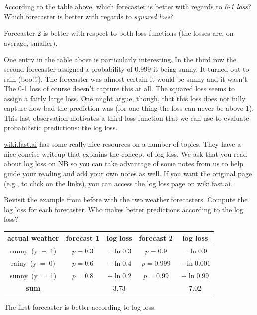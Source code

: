 \documentclass[assignment03_Solutions]{subfiles}
\begin{document}
\normalsize %

\begin{understandingcheck}
According to the table above, which forecaster is better with regards to \emph{0-1 loss}?  Which forecaster is better with regards to \emph{squared loss}?

\begin{boxedsolution}
Forecaster 2 is better with respect to both loss functions (the losses are, on average, smaller).
\end{boxedsolution}
\end{understandingcheck}

One entry in the table above is particularly interesting.  In the third row the second forecaster assigned a probability of $0.999$ it being sunny.  It turned out to rain (boo!!!).  The forecaster was almost certain it would be sunny and it wasn't.  The 0-1 loss of course doesn't capture this at all.  The squared loss seems to assign a fairly large loss.  One might argue, though, that this loss does not fully capture how bad the prediction was (for one thing the loss can never be above 1).  This last observation motivates a third loss function that we can use to evaluate probabilistic predictions: the log loss.

\begin{externalresources}[(30 minutes)]
\url{wiki.fast.ai} has some really nice resources on a number of topics.  They have a nice concise writeup that explains the concept of log loss.  We ask that you read about \href{http://nb.mit.edu/f/55213}{log loss on NB} so you can take advantage of some notes from us to help guide your reading and add your own notes as well.  If you want the original page (e.g., to click on the links), you can access the \href{http://wiki.fast.ai/index.php/Log_Loss}{log loss page on wiki.fast.ai}.
\begin{exercise}
Revisit the example from before with the two weather forecasters.  Compute the log loss for each forecaster.  Who makes better predictions according to the log loss?
\begin{boxedsolution}
\begin{center}
\small
\begin{tabular}{c | c | c | c | c }
\hline
actual weather & forecast 1 & log loss & forecast 2 & log loss \\
\hline
\mbox{sunny (y = 1)} & $p = 0.3$ & $-\ln 0.3$ & $p = 0.9$ &  $-\ln 0.9$\\
\mbox{rainy (y = 0)} & $p = 0.6$  &  $-\ln 0.4$ & $p = 0.999$ &  $-\ln 0.001$\\ 
\mbox{sunny (y = 1)} & $p = 0.8$ & $-\ln 0.2$ & $p = 0.99$ & $-\ln 0.99$\\
\hline
\textbf{sum} & & $3.73$ &  & 7.02
\end{tabular}
\end{center}
The first forecaster is better according to log loss.

\end{boxedsolution}

\end{exercise}
\end{externalresources}
\end{document}
